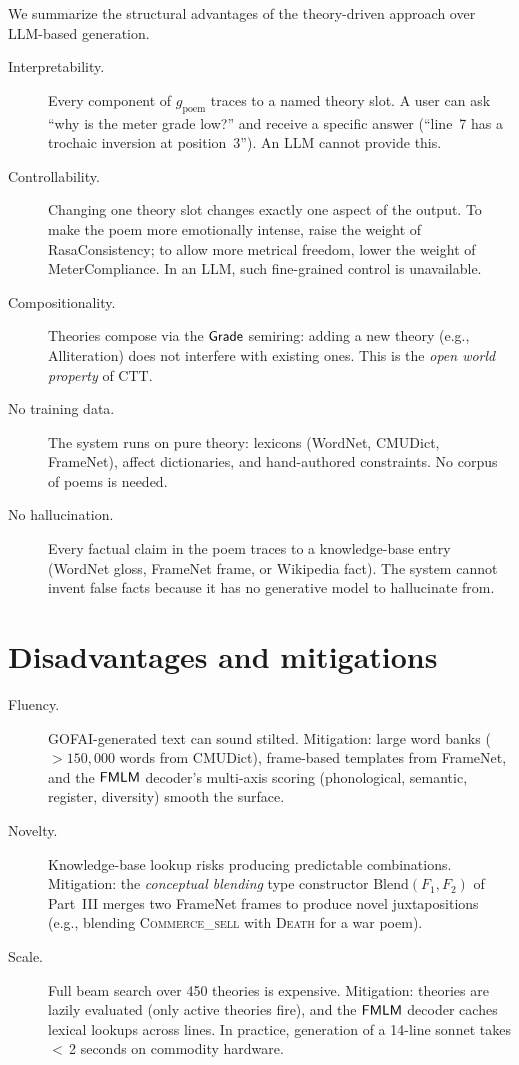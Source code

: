 We summarize the structural advantages of the theory-driven approach
over LLM-based generation.

\begin{description}
  \item[Interpretability.]
    Every component of $g_{\mathrm{poem}}$ traces to a named theory
    slot.  A user can ask ``why is the meter grade low?'' and receive
    a specific answer (``line~7 has a trochaic inversion at
    position~3'').  An LLM cannot provide this.
  \item[Controllability.]
    Changing one theory slot changes exactly one aspect of the
    output.  To make the poem more emotionally intense, raise the
    weight of \textsf{RasaConsistency}; to allow more metrical
    freedom, lower the weight of \textsf{MeterCompliance}.
    In an LLM, such fine-grained control is unavailable.
  \item[Compositionality.]
    Theories compose via the $\mathsf{Grade}$ semiring: adding a new
    theory (e.g., \textsf{Alliteration}) does not interfere with
    existing ones.  This is the \emph{open world property} of CTT.
  \item[No training data.]
    The system runs on pure theory: lexicons (WordNet, CMUDict,
    FrameNet), affect dictionaries, and hand-authored constraints.
    No corpus of poems is needed.
  \item[No hallucination.]
    Every factual claim in the poem traces to a knowledge-base
    entry (WordNet gloss, FrameNet frame, or Wikipedia fact).
    The system cannot invent false facts because it has no
    generative model to hallucinate from.
\end{description}

\section{Disadvantages and mitigations}
\label{sec:gofai-disadvantages}

\begin{description}
  \item[Fluency.]
    GOFAI-generated text can sound stilted.  Mitigation: large word
    banks ($> 150{,}000$ words from CMUDict), frame-based templates
    from FrameNet, and the $\mathsf{FMLM}$ decoder's multi-axis scoring
    (phonological, semantic, register, diversity) smooth the surface.
  \item[Novelty.]
    Knowledge-base lookup risks producing predictable combinations.
    Mitigation: the \emph{conceptual blending} type constructor
    $\mathrm{Blend}(F_1, F_2)$ of Part~III merges two FrameNet frames
    to produce novel juxtapositions (e.g., blending
    \textsc{Commerce\_sell} with \textsc{Death} for a war poem).
  \item[Scale.]
    Full beam search over 450 theories is expensive.
    Mitigation: theories are lazily evaluated (only active
    theories fire), and the $\mathsf{FMLM}$ decoder caches lexical lookups
    across lines.  In practice, generation of a 14-line sonnet
    takes $<$\,2 seconds on commodity hardware.
\end{description}

